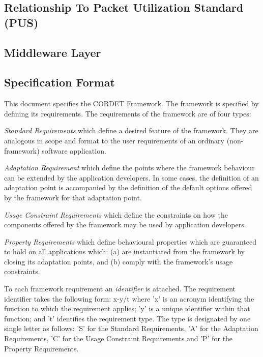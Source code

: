 \documentclass[a4paper,10pt]{article}
\newenvironment{fw_itemize}						%
{\begin{itemize}
  \setlength{\itemsep}{1mm}
  \setlength{\parskip}{0pt}
  \setlength{\parsep}{0pt}}
{\end{itemize}}
\begin{document}
\subsection{Relationship To Packet Utilization Standard (PUS)}\label{sec:RelationshipToPUS}


\subsection{Middleware Layer}\label{sec:MwLayer} 


\subsection{Specification Format}\label{sec:SpecFormat} 

This document specifies the CORDET Framework. 
The framework is specified by defining its requirements. 
The requirements of the framework are of four types:

\begin{fw_itemize}
\item{} \textit{Standard Requirements} which define a desired feature of the framework. 
They are analogous in scope and format to the user requirements of an ordinary (non-framework) software application.
\item{} \textit{Adaptation Requirement} which define the points where the framework behaviour can be extended by the application developers. 
In some cases, the definition of an adaptation point is accompanied by the definition of the default options offered by the framework for that adaptation point.  
\item{} \textit{Usage Constraint Requirements} which define the constraints on how the components offered by the framework may be used by application developers.
\item{} \textit{Property Requirements} which define behavioural properties which are guaranteed to hold on all applications which: (a) are instantiated from the framework by closing its adaptation points, and (b) comply with the framework's usage constraints.
\end{fw_itemize}

To each framework requirement an \textit{identifier} is attached.
The requirement identifier takes the following form: x-y/t where 'x' is an acronym identifying the function to which the requirement applies; 'y' is a unique identifier within that function; and 't' identifies the requirement type. 
The type is designated by one single letter as follows: 'S' for the Standard Requirements, 'A' for the Adaptation Requirements, 'C' for the Usage Constraint Requirements and 'P' for the Property Requirements.
\end{document}
